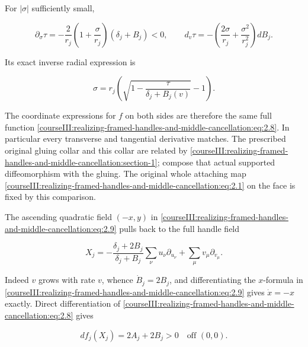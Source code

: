 For \(|\sigma|\) sufficiently small,

\begin{equation}
\partial_\sigma\tau
 =-\frac{2}{r_j}\left(1+\frac{\sigma}{r_j}\right)
                         (\delta_j+B_j)<0,\qquad
 d_v\tau=-\left(\frac{2\sigma}{r_j}+
                    \frac{\sigma^2}{r_j^2}\right)dB_j .
 \label{courseIII:realizing-framed-handles-and-middle-cancellation:eq:2.13}
\end{equation}

Its exact inverse radial expression is

\begin{equation}
\sigma=r_j\left(\sqrt{1-\frac{\tau}{\delta_j+B_j(v)}}-1\right).
 \label{courseIII:realizing-framed-handles-and-middle-cancellation:eq:2.14}
\end{equation}

The coordinate expressions for \(f\) on both sides are therefore the same full function \eqref{courseIII:realizing-framed-handles-and-middle-cancellation:eq:2.8}. In particular every transverse and tangential derivative matches. The prescribed original gluing collar and this collar are related by \cref{courseIII:realizing-framed-handles-and-middle-cancellation:section-1}; compose that actual supported diffeomorphism with the gluing. The original whole attaching map \eqref{courseIII:realizing-framed-handles-and-middle-cancellation:eq:2.1} on the face is fixed by this comparison.

The ascending quadratic field \((-x,y)\) in \eqref{courseIII:realizing-framed-handles-and-middle-cancellation:eq:2.9} pulls back to the full handle field

\begin{equation}
X_j=
 -\frac{\delta_j+2B_j}{\delta_j+B_j}
                  \sum_\nu u_\nu\partial_{u_\nu}
       +\sum_\mu v_\mu\partial_{v_\mu}.
 \label{courseIII:realizing-framed-handles-and-middle-cancellation:eq:2.15}
\end{equation}

Indeed \(v\) grows with rate \(v\), whence \(\dot B_j=2B_j\), and differentiating the \(x\)-formula in \eqref{courseIII:realizing-framed-handles-and-middle-cancellation:eq:2.9} gives \(\dot x=-x\) exactly. Direct differentiation of \eqref{courseIII:realizing-framed-handles-and-middle-cancellation:eq:2.8} gives

\begin{equation}
df_j(X_j)=2A_j+2B_j>0
 \quad\text{off }(0,0).
 \label{courseIII:realizing-framed-handles-and-middle-cancellation:eq:2.16}
\end{equation}


